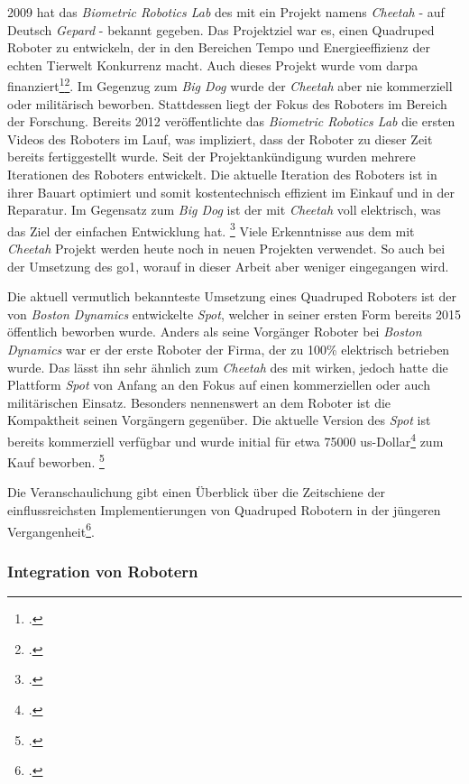\num{2009} hat das \emph{Biometric Robotics Lab} des \gls{mit} ein Projekt namens \emph{Cheetah} - auf Deutsch \emph{Gepard} -
bekannt gegeben.
Das Projektziel war es, einen Quadruped Roboter zu entwickeln, der in den Bereichen Tempo und Energieeffizienz der echten
Tierwelt Konkurrenz macht.
Auch dieses Projekt wurde vom \gls{darpa} finanziert\footcite{bi_mit_cheetah_funding}\footcite{darpa_m3}.
Im Gegenzug zum \emph{Big Dog} wurde der \emph{Cheetah} aber nie kommerziell oder militärisch beworben.
Stattdessen liegt der Fokus des Roboters im Bereich der Forschung.
Bereits \num{2012} veröffentlichte das \emph{Biometric Robotics Lab} die ersten Videos des Roboters im Lauf, was impliziert,
dass der Roboter zu dieser Zeit bereits fertiggestellt wurde.
Seit der Projektankündigung wurden mehrere Iterationen des Roboters entwickelt.
Die aktuelle Iteration des Roboters ist in ihrer Bauart optimiert und somit kostentechnisch effizient im Einkauf und in der Reparatur.
Im Gegensatz zum \emph{Big Dog} ist der \gls{mit} \emph{Cheetah} voll elektrisch, was das Ziel der einfachen Entwicklung hat.
\footcite{ieee_spectrum_cheetah}
Viele Erkenntnisse aus dem \gls{mit} \emph{Cheetah} Projekt werden heute noch in neuen Projekten verwendet.
So auch bei der Umsetzung des \gls{go1}, worauf in dieser Arbeit aber weniger eingegangen wird.

Die aktuell vermutlich bekannteste Umsetzung eines Quadruped Roboters ist der von \emph{Boston Dynamics} entwickelte
\emph{Spot}, welcher in seiner ersten Form bereits \num{2015} öffentlich beworben wurde.
Anders als seine Vorgänger Roboter bei \emph{Boston Dynamics} war er der erste Roboter der Firma, der zu \num{100}\%
elektrisch betrieben wurde.
Das lässt ihn sehr ähnlich zum \emph{Cheetah} des \gls{mit} wirken, jedoch hatte die Plattform \emph{Spot} von Anfang an den
Fokus auf einen kommerziellen oder auch militärischen Einsatz.
Besonders nennenswert an dem Roboter ist die Kompaktheit seinen Vorgängern gegenüber.
Die aktuelle Version des \emph{Spot} ist bereits kommerziell verfügbar und wurde initial für etwa \num{75000} \gls{us}-Dollar\footcite{spot_price}
zum Kauf beworben.
\footcite{boston_dynamics_legacy}

Die Veranschaulichung  gibt einen Überblick über die Zeitschiene der einflussreichsten
Implementierungen von Quadruped Robotern in der jüngeren Vergangenheit\footcite{quadruped_timeline}.


\subsubsection{Integration von Robotern}
\label{subsubsec:integration}

